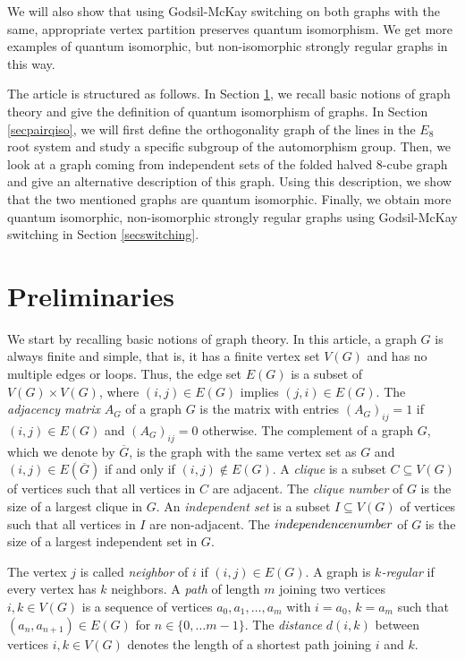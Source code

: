 \documentclass[11pt]{article}
\theoremstyle{definition}
\numberwithin{equation}{section}
\begin{document}
We will also show that using Godsil-McKay switching on both graphs with the same, appropriate vertex partition preserves quantum isomorphism. We get more examples of quantum isomorphic, but non-isomorphic strongly regular graphs in this way. 

The article is structured as follows. In Section \ref{secprelim}, we recall basic notions of graph theory and give the definition of quantum isomorphism of graphs. In Section \ref{secpairqiso}, we will first define the orthogonality graph of the lines in the $E_8$ root system and study a specific subgroup of the automorphism group. Then, we look at a graph coming from independent sets of the folded halved $8$-cube graph and give an alternative description of this graph. Using this description, we show that the two mentioned graphs are quantum isomorphic. Finally, we obtain more quantum isomorphic, non-isomorphic strongly regular graphs using Godsil-McKay switching in Section \ref{secswitching}. 


\section{Preliminaries}\label{secprelim}
We start by recalling basic notions of graph theory. In this article, a graph $G$ is always finite and simple, that is, it has a finite vertex set $V(G)$ and has no multiple edges or loops. Thus, the edge set $E(G)$ is a subset of $V(G)\times V(G)$, where $(i,j)\in E(G)$ implies $(j,i)\in E(G)$. The \emph{adjacency matrix} $A_G$ of a graph $G$ is the matrix with entries $(A_G)_{ij}=1$ if $(i,j)\in E(G)$ and $(A_G)_{ij}=0$ otherwise. The complement of a graph $G$, which we denote by $\overline{G}$, is the graph with the same vertex set as $G$ and $(i,j)\in E(\overline{G})$ if and only if $(i,j)\notin E(G)$. 
A \emph{clique} is a subset $C\subseteq V(G)$ of vertices such that all vertices in $C$ are adjacent. The \emph{clique number} of $G$ is the size of a largest clique in $G$. An \emph{independent set} is a subset $I\subseteq V(G)$ of vertices such that all vertices in $I$ are non-adjacent. The $\emph{independence number}$ of $G$ is the size of a largest independent set in $G$.

The vertex $j$ is called \emph{neighbor} of $i$ if $(i,j)\in E(G)$. A graph is \emph{$k$-regular} if every vertex has $k$ neighbors. A \emph{path} of length $m$ joining two vertices $i,k \in V(G)$ is a sequence of vertices $a_0, a_1, \dots, a_m$ with $i=a_0$, $k=a_m$ such that $(a_n,a_{n+1})\in E(G)$ for $n\in \{0, \dots m-1\}$. The \emph{distance} $d(i,k)$ between vertices $i,k\in V(G)$ denotes the length of a shortest path joining $i$ and $k$. 
\end{document}
